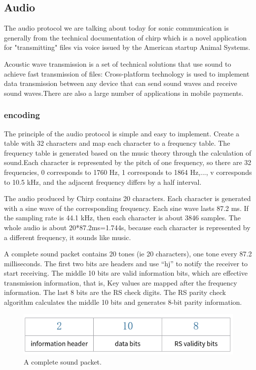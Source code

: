 \documentclass[journal]{IEEEtran}
\begin{document}
\subsection{Audio}

The audio protocol we are talking about today for sonic communication is generally from the technical documentation of chirp which is a novel application for "transmitting" files via voice issued by the American startup Animal Systems.

Acoustic wave transmission is a set of technical solutions that use sound to achieve fast transmission of files: Cross-platform technology is used to implement data transmission between any device that can send sound waves and receive sound waves.There are also a large number of applications in mobile payments.

\subsubsection{encoding}
The principle of the audio protocol is simple and easy to implement. Create a table with 32 characters and map each character to a frequency table. The frequency table is generated based on the music theory through the calculation of sound.Each character is represented by the pitch of one frequency, so there are 32 frequencies, 0 corresponds to 1760 Hz, 1 corresponds to 1864 Hz,..., v corresponds to 10.5 kHz, and the adjacent frequency differs by a half interval.

The audio produced by Chirp contains 20 characters. Each character is generated with a sine wave of the corresponding frequency. Each sine wave lasts 87.2 ms. If the sampling rate is 44.1 kHz, then each character is about 3846 samples. The whole audio is about 20*87.2ms=1.744s, because each character is represented by a different frequency, it sounds like music.

A complete sound packet contains 20 tones (ie 20 characters), one tone every 87.2 milliseconds. The first two bits are headers and use “hj” to notify the receiver to start receiving. The middle 10 bits are valid information bits, which are effective transmission information, that is, Key values are mapped after the frequency information. The last 8 bits are the RS check digits. The RS parity check algorithm calculates the middle 10 bits and generates 8-bit parity information.

\begin{figure}[htbp]
\centerline{\includegraphics[scale=0.4]{yinpinwei.png}}
\caption{A complete sound packet.}
\label{fig}
\end{figure}
\end{document}
